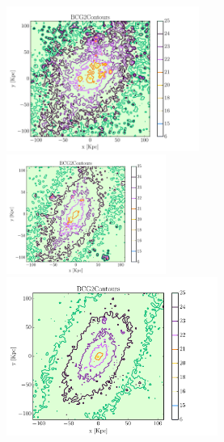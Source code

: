 \begin{figure}[H]
 \hspace*{-1.4cm}\includegraphics[height=6.cm, width=6.3cm    ,trim={0cm   0.1cm 4.7cm 1.38cm},clip ]{../al_final/LR/LR_minpot3_rmmax/nodust/grupo0/mu24/D2/091/contoursmaps125.pdf}
  \hspace*{-.1cm}\includegraphics[height=6.cm, width=5.2cm,trim={2.5cm 0.1cm 4.7cm 1.38cm},clip ]{../al_final/MR/MR_minpot3_rmmax/nodust/grupo0/mu24/D2/091/contoursmaps125.pdf}
  \hspace*{-.1cm}\includegraphics[height=6.cm, width=6.9cm,trim={2.5cm 0.1cm 0.3cm 1.38cm},clip ]{../al_final/HR/HR_minpot3_rmmax/nodust/grupo0/mu24/D2/091/contoursmaps125.pdf}
\end{figure}


